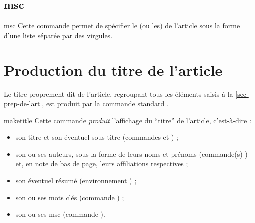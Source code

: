 \subsection{\texorpdfstring{\acrfull{msc}}{MSC}}

\begin{docCommand}[doc description=\mandatory]{msc}{}
  Cette commande permet de spécifier le (ou les)  de
  l'article sous la forme d'une liste séparée par des virgules.
\end{docCommand}

\section{Production du titre de l'article}
\label{sec-creation-du-titre}

Le titre proprement dit de l'article, regroupant tous les éléments saisis à la
\vref{sec-prep-de-lart}, est produit par la commande standard
.

\begin{docCommand}[doc description=\mandatory]{maketitle}{}
  Cette commande \emph{produit} l'affichage du \enquote{titre} de l'article,
  c'est-à-dire :
  \begin{itemize}
  \item son titre et son éventuel sous-titre (commandes  et
    ) ;
  \item son ou ses auteurs, sous la forme de leurs noms et prénoms (commande(s)
    ) et, en note de bas de page, leurs affiliations respectives ;
  \item son éventuel résumé (environnement ) ;
  \item son ou ses mots clés (commande ) ;
  \item son ou ses \acrshort{msc} (commande ).
  \end{itemize}
\end{docCommand}


